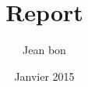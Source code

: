 \documentclass[11pt,a4paper,oneside]{report}
\begin{document}
\title{Report}
\author{Jean bon}
\date{Janvier 2015}
\maketitle
\end{document}
